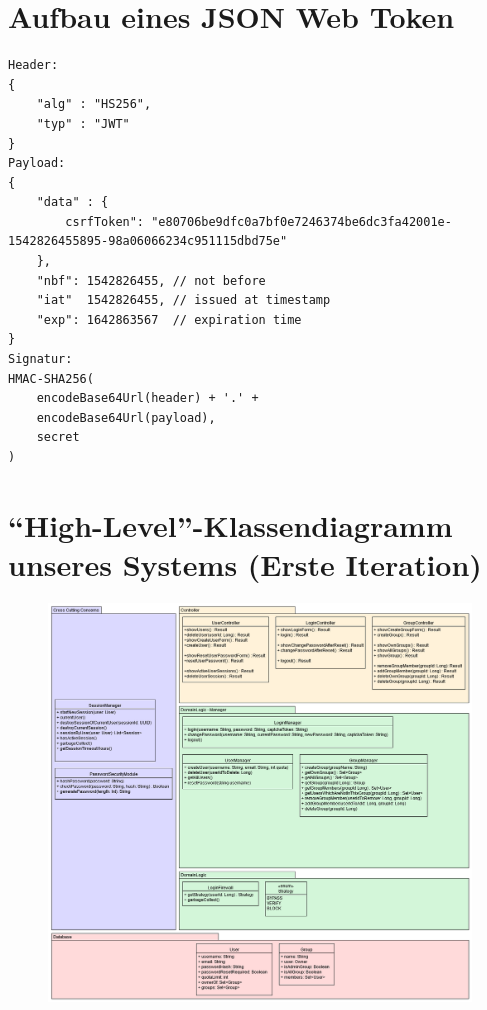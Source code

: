 \documentclass[12pt,DIV14,BCOR10mm,a4paper,parskip=half-,headsepline,headinclude,english,ngerman,bibliography=totocnumbered]{scrreprt}
\begin{document}
\begin{appendices}


\chapter{Aufbau eines JSON Web Token}
\begin{sloppypar}
\begin{lstlisting}[label=jwtformat]
Header:
{
	"alg" : "HS256",
	"typ" : "JWT"
}
Payload:
{
	"data" : {
		csrfToken": "e80706be9dfc0a7bf0e7246374be6dc3fa42001e-1542826455895-98a06066234c951115dbd75e"
	},
	"nbf": 1542826455, // not before
	"iat"  1542826455, // issued at timestamp
	"exp": 1642863567  // expiration time
}
Signatur:
HMAC-SHA256(
	encodeBase64Url(header) + '.' +
	encodeBase64Url(payload),
	secret
)
\end{lstlisting}
\end{sloppypar}

\chapter{\enquote{High-Level}-Klassendiagramm unseres Systems (Erste Iteration)}
\begin{figure}[!htb]
	\hspace*{-2.5cm}
	\includegraphics[width=0.93\paperwidth]{resources/class_diagram.png}
	\label{architecture:class_diagram}
\end{figure}


\end{appendices}
\end{document}
